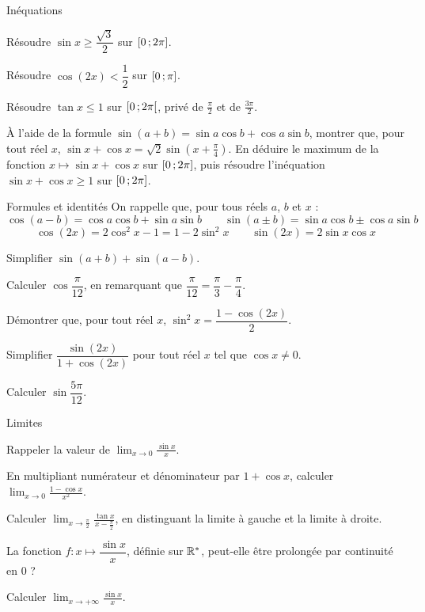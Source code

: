 \begin{exercice}[2]{Inéquations}
\begin{questions}
  \item Résoudre $\sin x\geq\dfrac{\sqrt3}{2}$ sur $\mathopen{[}0\,{;}\,2\pi\mathclose{]}$.
  \item Résoudre $\cos(2x)<\dfrac12$ sur $\mathopen{[}0\,{;}\,\pi\mathclose{]}$.
  \item Résoudre $\tan x\leq1$ sur $\mathopen{[}0\,{;}\,2\pi\mathclose{[}$, privé de $\frac{\pi}{2}$ et de $\frac{3\pi}{2}$.
  \item À l'aide de la formule $\sin(a+b)=\sin a\cos b+\cos a\sin b$, montrer que, pour tout réel $x$,
    $\sin x+\cos x=\sqrt2\sin\left(x+\frac{\pi}{4}\right)$. En déduire le maximum de la fonction $x\mapsto\sin x+\cos x$
    sur $\mathopen{[}0\,{;}\,2\pi\mathclose{]}$, puis résoudre l'inéquation $\sin x+\cos x\geq1$ sur $\mathopen{[}0\,{;}\,2\pi\mathclose{]}$.
\end{questions}
\end{exercice}

\begin{exercice}[2]{Formules et identités}
On rappelle que, pour tous réels $a$, $b$ et $x$ :
\[ \cos(a-b)=\cos a\cos b+\sin a\sin b \qquad \sin(a\pm b)=\sin a\cos b\pm\cos a\sin b \]
\[ \cos(2x)=2\cos^{2}x-1=1-2\sin^{2}x \qquad \sin(2x)=2\sin x\cos x \]
\begin{questions}
  \item Simplifier $\sin(a+b)+\sin(a-b)$.
  \item Calculer $\cos\dfrac{\pi}{12}$, en remarquant que $\dfrac{\pi}{12}=\dfrac{\pi}{3}-\dfrac{\pi}{4}$.
  \item Démontrer que, pour tout réel $x$, $\sin^{2}x=\dfrac{1-\cos(2x)}{2}$.
  \item Simplifier $\dfrac{\sin(2x)}{1+\cos(2x)}$ pour tout réel $x$ tel que $\cos x\neq0$.
  \item Calculer $\sin\dfrac{5\pi}{12}$.
\end{questions}
\end{exercice}

\begin{exercice}[2]{Limites}
\begin{questions}
  \item Rappeler la valeur de $\displaystyle\lim_{x\to0}\frac{\sin x}{x}$.
  \item En multipliant numérateur et dénominateur par $1+\cos x$, calculer $\displaystyle\lim_{x\to0}\frac{1-\cos x}{x^{2}}$.
  \item Calculer $\displaystyle\lim_{x\to\frac{\pi}{2}}\frac{\tan x}{x-\frac{\pi}{2}}$, en distinguant la limite à gauche et la limite à droite.
  \item La fonction $f:x\mapsto\dfrac{\sin x}{x}$, définie sur $\mathbb{R}^{*}$, peut-elle être prolongée par continuité en $0$ ?
  \item Calculer $\displaystyle\lim_{x\to+\infty}\frac{\sin x}{x}$.
\end{questions}
\end{exercice}


